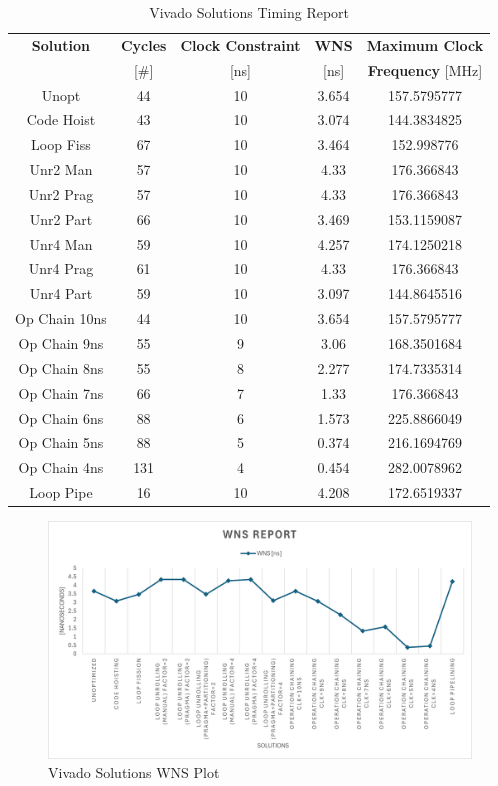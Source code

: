 \begin{table}[H]
	\centering
	\begin{tabular}{|c|c|c|c|c|}
		\hline
		\textbf{Solution} & \textbf{Cycles} & \textbf{Clock Constraint} & \textbf{WNS} & \textbf{Maximum Clock}\\
		& [\#] & [ns] & [ns] & \textbf{Frequency} [MHz]\\
		\hline
		Unopt & 44 & 10 & 3.654 & 157.5795777\\
		Code Hoist & 43 & 10 & 3.074 & 144.3834825\\
		Loop Fiss & 67 & 10 & 3.464 & 152.998776\\
		Unr2 Man & 57 & 10 & 4.33 & 176.366843\\
		Unr2 Prag & 57 & 10 & 4.33 & 176.366843\\
		Unr2 Part & 66 & 10 & 3.469 & 153.1159087\\
		Unr4 Man & 59 & 10 & 4.257 & 174.1250218\\
		Unr4 Prag & 61 & 10 & 4.33 & 176.366843\\
		Unr4 Part & 59 & 10 & 3.097 & 144.8645516\\
		Op Chain 10ns & 44 & 10 & 3.654 & 157.5795777\\
		Op Chain 9ns & 55 & 9 & 3.06 & 168.3501684\\
		Op Chain 8ns & 55 & 8 & 2.277 & 174.7335314\\
		Op Chain 7ns & 66 & 7 & 1.33 & 176.366843\\
		Op Chain 6ns & 88 & 6 & 1.573 & 225.8866049\\
		Op Chain 5ns & 88 & 5 & 0.374 & 216.1694769\\
		Op Chain 4ns & 131 & 4 & 0.454 & 282.0078962\\
		Loop Pipe & 16 & 10 & 4.208 & 172.6519337\\
		\hline
	\end{tabular}
	\caption{Vivado Solutions Timing Report}
	\label{tab:vivado-solutions-timing-report}
\end{table}

\begin{figure}[H]
	\centering
	\includegraphics[width=0.7\textheight]{conclusions/wns.png}
	\caption{Vivado Solutions WNS Plot}
	\label{fig:vivado-wns-plot}
\end{figure}

